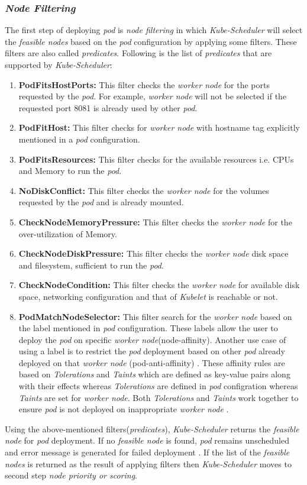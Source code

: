 \subsubsection{\emph{Node Filtering}}
\label{sec:node-filter}
The first step of deploying \emph{pod} is \emph{node filtering} in which \emph{Kube-Scheduler} will select the \emph{feasible nodes} based on the \emph{pod} configuration by applying some filters\cite{Santos2019}. These filters are also called \emph{predicates}. Following is the list of \emph{predicates} that are supported by \emph{Kube-Scheduler}\cite{k8s}:
\begin{enumerate}
  \item \textbf{PodFitsHostPorts:} This filter checks the \emph{worker node} for the ports requested by the \emph{pod}. For example, \emph{worker node} will not be selected if the requested port 8081 is already used by other \emph{pod}.
  \item \textbf{PodFitHost:} This filter checks for \emph{worker node} with hostname tag explicitly mentioned in a \emph{pod} configuration.
  \item \textbf{PodFitsResources:} This filter checks for the available resources i.e. CPUs and Memory to run the \emph{pod}.
  \item \textbf{NoDiskConflict:} This filter checks the \emph{worker node} for the volumes requested by the \emph{pod} and is already mounted.
  \item \textbf{CheckNodeMemoryPressure:} This filter checks the \emph{worker node} for the over-utilization of Memory.
  \item \textbf{CheckNodeDiskPressure:} This filter checks the \emph{worker node} disk space and filesystem, sufficient to run the \emph{pod}.
  \item \textbf{CheckNodeCondition:} This filter checks the \emph{worker node} for available disk space, networking configuration and that of \emph{Kubelet} is reachable or not.
  \item \textbf{PodMatchNodeSelector:} This filter search for the \emph{worker node} based on the label mentioned in \emph{pod} configuration. These labels allow the user to deploy the \emph{pod} on specific \emph{worker node}(node-affinity)\cite{Santos2019}. Another use case of using a label is to restrict the \emph{pod} deployment based on other \emph{pod} already deployed on that \emph{worker node} (pod-anti-affinity) \cite{Santos2019}. These affinity rules are based on \emph{Tolerations} and \emph{Taints} which are defined as key-value pairs along with their effects whereas \emph{Tolerations} are defined in \emph{pod} configration whereas \emph{Taints} are set for \emph{worker node}\cite{k8s}. Both \emph{Tolerations} and \emph{Taints} work together to ensure \emph{pod} is not deployed on inappropriate \emph{worker node} \cite{k8s}.
\end{enumerate}
Using the above-mentioned filters(\emph{predicates}), \emph{Kube-Scheduler} returns the \emph{feasible node} for \emph{pod} deployment. If no \emph{feasible node} is found, \emph{pod} remains unscheduled and error message is generated for failed deployment \cite{Santos2019}. If the list of the \emph{feasible nodes} is returned as the result of applying filters then \emph{Kube-Scheduler} moves to second step \emph{node priority or scoring}.
